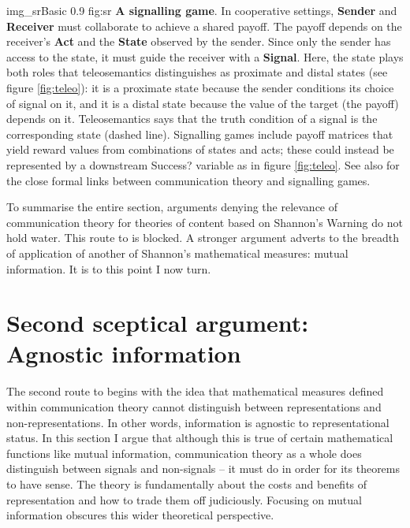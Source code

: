 \documentclass[12pt]{article}
\begin{document}
\begin{myfig}
    {img_srBasic} %
    {0.9} %
    {fig:sr} %
    {\textbf{A signalling game}.
    In cooperative settings, \textbf{Sender} and \textbf{Receiver} must collaborate to achieve a shared payoff.
    The payoff depends on the receiver's \textbf{Act} and the \textbf{State} observed by the sender.
    Since only the sender has access to the state, it must guide the receiver with a \textbf{Signal}.
    Here, the state plays both roles that teleosemantics distinguishes as proximate and distal states (see figure \ref{fig:teleo}): it is a proximate state because the sender conditions its choice of signal on it, and it is a distal state because the value of the target (the payoff) depends on it.
    Teleosemantics says that the truth condition of a signal is the corresponding state (dashed line).
    Signalling games include payoff matrices that yield reward values from combinations of states and acts; these could instead be represented by a downstream Success? variable as in figure \ref{fig:teleo}.
    See also \citet{martinez2019deception} for the close formal links between communication theory and signalling games.
    } %
\end{myfig}

To summarise the entire section, arguments denying the relevance of communication theory for theories of content based on {\sc Shannon's Warning} do not hold water.
This route to \tic{} is blocked.
A stronger argument adverts to the breadth of application of another of Shannon's mathematical measures: mutual information.
It is to this point I now turn.


\section{Second sceptical argument: Agnostic information}\label{sec:agnostic}

The second route to \tic{} begins with the idea that mathematical measures defined within communication theory cannot distinguish between representations and non-representations.
In other words, information is agnostic to representational status.
In this section I argue that although this is true of certain mathematical functions like mutual information, communication theory as a whole does distinguish between signals and non-signals -- it must do in order for its theorems to have sense.
The theory is fundamentally about the costs and benefits of representation and how to trade them off judiciously.
Focusing on mutual information obscures this wider theoretical perspective.
\end{document}

